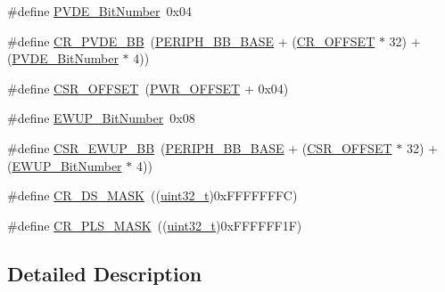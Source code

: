 \begin{DoxyCompactItemize}
\item 
\#define \hyperlink{group___p_w_r___private___defines_ga17d618eb800c401ef9c6789c9374eaf8}{P\+V\+D\+E\+\_\+\+Bit\+Number}~0x04
\item 
\#define \hyperlink{group___p_w_r___private___defines_ga49f51ef8285a6be76fd204d49a00709c}{C\+R\+\_\+\+P\+V\+D\+E\+\_\+\+BB}~(\hyperlink{openmotestm_2library_2inc_2stm32f10x__map_8h_aed7efc100877000845c236ccdc9e144a}{P\+E\+R\+I\+P\+H\+\_\+\+B\+B\+\_\+\+B\+A\+SE} + (\hyperlink{openmotestm_2library_2src_2stm32f10x__rcc_8c_afa1d3d0ea72132df651c76fc1bdffffc}{C\+R\+\_\+\+O\+F\+F\+S\+ET} $\ast$ 32) + (\hyperlink{openmotestm_2library_2src_2stm32f10x__pwr_8c_a17d618eb800c401ef9c6789c9374eaf8}{P\+V\+D\+E\+\_\+\+Bit\+Number} $\ast$ 4))
\item 
\#define \hyperlink{group___p_w_r___private___defines_ga984cbe73312b6d3d355c5053763d499a}{C\+S\+R\+\_\+\+O\+F\+F\+S\+ET}~(\hyperlink{openmotestm_2library_2src_2stm32f10x__pwr_8c_a7f88bce73931300319824f22578f90de}{P\+W\+R\+\_\+\+O\+F\+F\+S\+ET} + 0x04)
\item 
\#define \hyperlink{group___p_w_r___private___defines_ga94fe0520e8f9b71fa2b99c0565ec70ea}{E\+W\+U\+P\+\_\+\+Bit\+Number}~0x08
\item 
\#define \hyperlink{group___p_w_r___private___defines_gaaff864595f697850b19173b0bca991b0}{C\+S\+R\+\_\+\+E\+W\+U\+P\+\_\+\+BB}~(\hyperlink{openmotestm_2library_2inc_2stm32f10x__map_8h_aed7efc100877000845c236ccdc9e144a}{P\+E\+R\+I\+P\+H\+\_\+\+B\+B\+\_\+\+B\+A\+SE} + (\hyperlink{openmotestm_2library_2src_2stm32f10x__rcc_8c_a984cbe73312b6d3d355c5053763d499a}{C\+S\+R\+\_\+\+O\+F\+F\+S\+ET} $\ast$ 32) + (\hyperlink{openmotestm_2library_2src_2stm32f10x__pwr_8c_a94fe0520e8f9b71fa2b99c0565ec70ea}{E\+W\+U\+P\+\_\+\+Bit\+Number} $\ast$ 4))
\item 
\#define \hyperlink{group___p_w_r___private___defines_ga8ee6bf9218f3c476629dd9ee70deef21}{C\+R\+\_\+\+D\+S\+\_\+\+M\+A\+SK}~((\hyperlink{_p_e___types_8h_a33594304e786b158f3fb30289278f5af}{uint32\+\_\+t})0x\+F\+F\+F\+F\+F\+F\+F\+C)
\item 
\#define \hyperlink{group___p_w_r___private___defines_gac4a30eebdd1d292331a578b189962e77}{C\+R\+\_\+\+P\+L\+S\+\_\+\+M\+A\+SK}~((\hyperlink{_p_e___types_8h_a33594304e786b158f3fb30289278f5af}{uint32\+\_\+t})0x\+F\+F\+F\+F\+F\+F1\+F)
\end{DoxyCompactItemize}


\subsection{Detailed Description}


